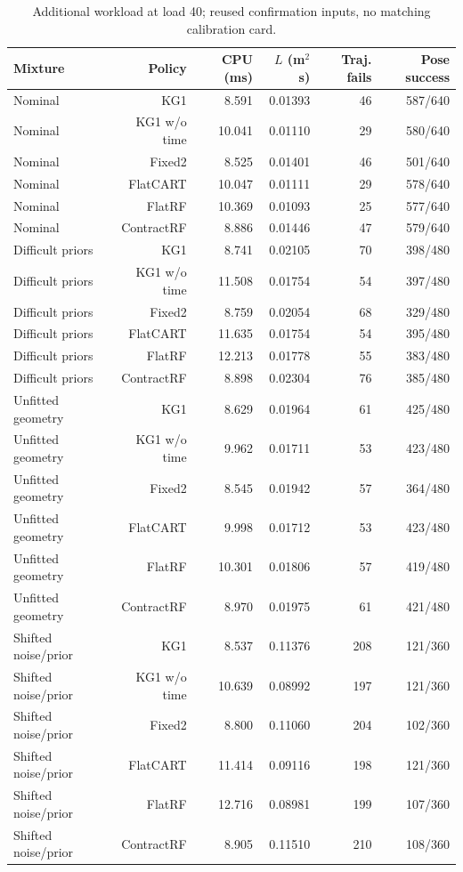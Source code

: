 \begin{table}[!htbp]\centering\scriptsize
\caption{Additional workload at load 40; reused confirmation inputs, no matching calibration card.}\label{supp:stress40}
\begin{tabular}{@{}lrrrrr@{}}\toprule
Mixture & Policy & CPU (ms) & $L$ (m$^2$s) & Traj. fails & Pose success\\\midrule
Nominal & KG1 & 8.591 & 0.01393 & 46 & 587/640\\
Nominal & KG1 w/o time & 10.041 & 0.01110 & 29 & 580/640\\
Nominal & Fixed2 & 8.525 & 0.01401 & 46 & 501/640\\
Nominal & FlatCART & 10.047 & 0.01111 & 29 & 578/640\\
Nominal & FlatRF & 10.369 & 0.01093 & 25 & 577/640\\
Nominal & ContractRF & 8.886 & 0.01446 & 47 & 579/640\\
Difficult priors & KG1 & 8.741 & 0.02105 & 70 & 398/480\\
Difficult priors & KG1 w/o time & 11.508 & 0.01754 & 54 & 397/480\\
Difficult priors & Fixed2 & 8.759 & 0.02054 & 68 & 329/480\\
Difficult priors & FlatCART & 11.635 & 0.01754 & 54 & 395/480\\
Difficult priors & FlatRF & 12.213 & 0.01778 & 55 & 383/480\\
Difficult priors & ContractRF & 8.898 & 0.02304 & 76 & 385/480\\
Unfitted geometry & KG1 & 8.629 & 0.01964 & 61 & 425/480\\
Unfitted geometry & KG1 w/o time & 9.962 & 0.01711 & 53 & 423/480\\
Unfitted geometry & Fixed2 & 8.545 & 0.01942 & 57 & 364/480\\
Unfitted geometry & FlatCART & 9.998 & 0.01712 & 53 & 423/480\\
Unfitted geometry & FlatRF & 10.301 & 0.01806 & 57 & 419/480\\
Unfitted geometry & ContractRF & 8.970 & 0.01975 & 61 & 421/480\\
Shifted noise/prior & KG1 & 8.537 & 0.11376 & 208 & 121/360\\
Shifted noise/prior & KG1 w/o time & 10.639 & 0.08992 & 197 & 121/360\\
Shifted noise/prior & Fixed2 & 8.800 & 0.11060 & 204 & 102/360\\
Shifted noise/prior & FlatCART & 11.414 & 0.09116 & 198 & 121/360\\
Shifted noise/prior & FlatRF & 12.716 & 0.08981 & 199 & 107/360\\
Shifted noise/prior & ContractRF & 8.905 & 0.11510 & 210 & 108/360\\
\bottomrule\end{tabular}\end{table}

